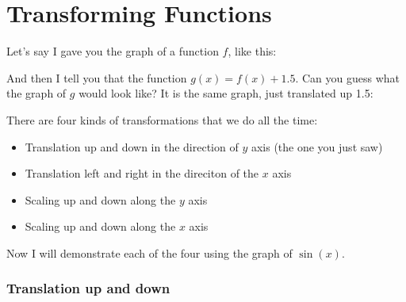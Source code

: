 \chapter{Transforming Functions}

Let's say I gave you the graph of a function $f$, like this:


And then I tell you that the function $g(x) = f(x) + 1.5$.  Can you guess what the graph of $g$ would look like? It is the same graph, just translated up 1.5:


There are four kinds of transformations that we do all the time:
\begin{itemize}
\item Translation up and down in the direction of $y$ axis (the one you just saw)
\item Translation left and right in the direciton of the $x$ axis
\item Scaling up and down along the $y$ axis
\item Scaling up and down along the $x$ axis
\end{itemize}

Now I will demonstrate each of the four using the graph of $\sin(x)$.

\subsection{Translation up and down}

